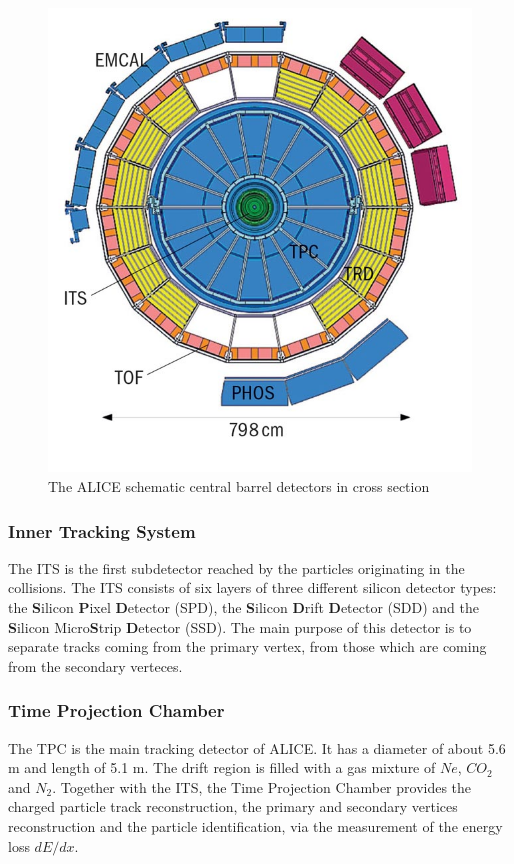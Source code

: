 \documentclass[a4paper,twocolumn,gsifonts,twoside]{gsipaper}
\begin{document}
\begin{figure}[htb]
\begin{center}
\includegraphics[scale = 0.25]{ITS_TPC.jpg}
\caption{The ALICE schematic central barrel detectors in cross section}
\label{ALICE_section}
\end{center}
\end{figure}

\newpage
\subsubsection{Inner Tracking System}
The ITS is the first subdetector reached by the particles originating in the collisions. The ITS consists of six layers of three 
different silicon detector types: the \textbf{S}ilicon \textbf{P}ixel \textbf{D}etector (SPD), the \textbf{S}ilicon \textbf{D}rift
\textbf{D}etector (SDD) and the \textbf{S}ilicon Micro\textbf{S}trip \textbf{D}etector (SSD). The main purpose of this detector is to 
separate tracks coming from the primary vertex, from those which are coming from the secondary verteces.

\subsubsection{Time Projection Chamber}
The TPC is the main tracking detector of ALICE. It has a diameter of about 5.6 m and length of 5.1 m. The drift region is filled with 
a gas mixture of $Ne$, $CO_{2}$ and $N_{2}$. Together with the ITS, the Time Projection Chamber provides the charged particle track 
reconstruction, the primary and secondary vertices reconstruction and the particle identification, via the measurement of the energy 
loss $dE/dx$.
\end{document}
